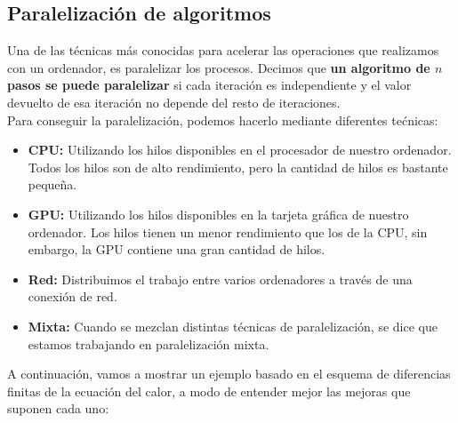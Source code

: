 \subsection{Paralelización de algoritmos}
Una de las técnicas más conocidas para acelerar las operaciones que realizamos con un ordenador, es paralelizar los procesos.  Decimos que \textbf{un algoritmo de $n$ pasos se puede paralelizar} si cada iteración es independiente y el valor devuelto de esa iteración no depende del resto de iteraciones. \\
Para conseguir la paralelización, podemos hacerlo mediante diferentes tećnicas:

\begin{itemize}
\item \textbf{CPU:} Utilizando los hilos disponibles en el procesador de nuestro ordenador. Todos los hilos son de alto rendimiento, pero la cantidad de hilos es bastante pequeña.

\item \textbf{GPU:} Utilizando los hilos disponibles en la tarjeta gráfica de nuestro ordenador. Los hilos tienen un menor rendimiento que los de la CPU, sin embargo, la GPU contiene una gran cantidad de hilos.
  
\item \textbf{Red:} Distribuimos el trabajo entre varios ordenadores a través de una conexión de red.
  
\item \textbf{Mixta: } Cuando se mezclan distintas técnicas de paralelización, se dice que estamos trabajando en paralelización mixta.
\end{itemize}

A continuación, vamos a mostrar un ejemplo basado en el esquema de diferencias finitas de la ecuación del calor, a modo de entender mejor las mejoras que suponen cada uno:

